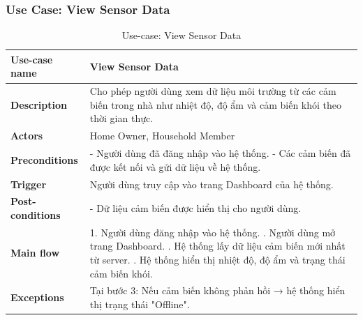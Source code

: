 \documentclass[a4paper,twoside]{article}
\begin{document}
\subsubsection{Use Case: View Sensor Data}
\begin{table}[H]
\centering
\begin{tabular}{|p{4cm}|p{11cm}|}
\hline
\textbf{Use-case name} & View Sensor Data \\ \hline

\textbf{Description} &
Cho phép người dùng xem dữ liệu môi trường từ các cảm biến trong nhà
như nhiệt độ, độ ẩm và cảm biến khói theo thời gian thực. \\ \hline

\textbf{Actors} &
Home Owner, Household Member \\ \hline

\textbf{Preconditions} &
- Người dùng đã đăng nhập vào hệ thống. \newline
- Các cảm biến đã được kết nối và gửi dữ liệu về hệ thống. \\ \hline

\textbf{Trigger} &
Người dùng truy cập vào trang Dashboard của hệ thống. \\ \hline

\textbf{Post-conditions} &
- Dữ liệu cảm biến được hiển thị cho người dùng. \\ \hline

\textbf{Main flow} &
1. Người dùng đăng nhập vào hệ thống. \newline
2. Người dùng mở trang Dashboard. \newline
3. Hệ thống lấy dữ liệu cảm biến mới nhất từ server. \newline
4. Hệ thống hiển thị nhiệt độ, độ ẩm và trạng thái cảm biến khói. \\ \hline

\textbf{Exceptions} &
Tại bước 3: Nếu cảm biến không phản hồi → hệ thống hiển thị trạng thái "Offline". \\ \hline
\end{tabular}
\caption{Use-case: View Sensor Data}
\end{table}


\end{document}
